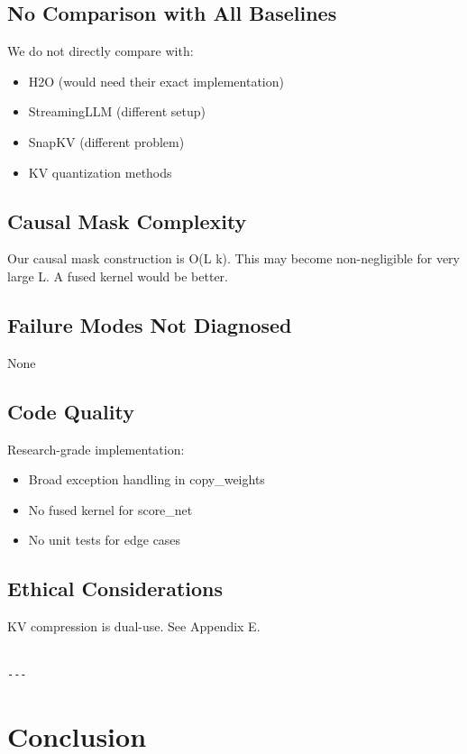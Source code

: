 \subsection{No Comparison with All Baselines}

We do not directly compare with:
\begin{itemize}
\item H2O (would need their exact implementation)
\item StreamingLLM (different setup)
\item SnapKV (different problem)
\item KV quantization methods

\end{itemize}
\subsection{Causal Mask Complexity}

Our causal mask construction is O(L k). This may become non-negligible 
for very large L. A fused kernel would be better.

\subsection{Failure Modes Not Diagnosed}

None

\subsection{Code Quality}

Research-grade implementation:
\begin{itemize}
\item Broad exception handling in copy\_weights
\item No fused kernel for score\_net
\item No unit tests for edge cases

\end{itemize}
\subsection{Ethical Considerations}

KV compression is dual-use. See Appendix E.
\begin{lstlisting}

---
\end{lstlisting}

\section{Conclusion}

